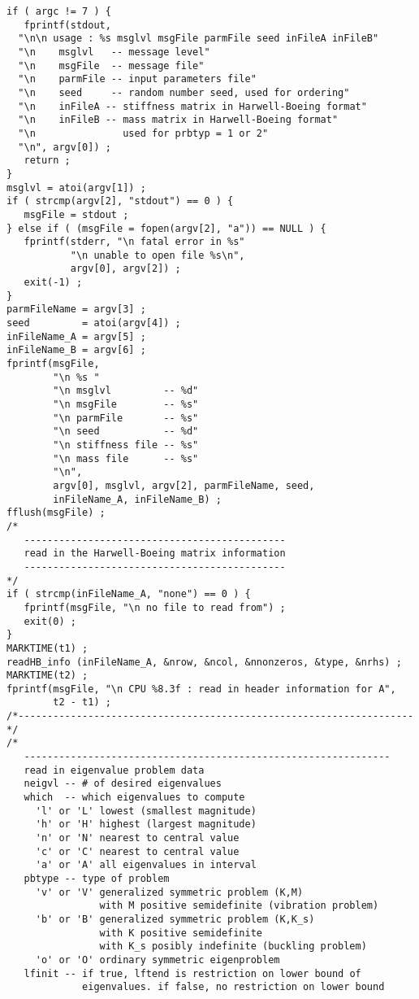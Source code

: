 \begin{verbatim}
if ( argc != 7 ) {
   fprintf(stdout, 
  "\n\n usage : %s msglvl msgFile parmFile seed inFileA inFileB"
  "\n    msglvl   -- message level"
  "\n    msgFile  -- message file"
  "\n    parmFile -- input parameters file"
  "\n    seed     -- random number seed, used for ordering"
  "\n    inFileA -- stiffness matrix in Harwell-Boeing format"
  "\n    inFileB -- mass matrix in Harwell-Boeing format"
  "\n               used for prbtyp = 1 or 2"
  "\n", argv[0]) ;
   return ;
}
msglvl = atoi(argv[1]) ;
if ( strcmp(argv[2], "stdout") == 0 ) {
   msgFile = stdout ;
} else if ( (msgFile = fopen(argv[2], "a")) == NULL ) {
   fprintf(stderr, "\n fatal error in %s"
           "\n unable to open file %s\n",
           argv[0], argv[2]) ;
   exit(-1) ;
}
parmFileName = argv[3] ;
seed         = atoi(argv[4]) ;
inFileName_A = argv[5] ;
inFileName_B = argv[6] ;
fprintf(msgFile, 
        "\n %s "
        "\n msglvl         -- %d" 
        "\n msgFile        -- %s" 
        "\n parmFile       -- %s" 
        "\n seed           -- %d" 
        "\n stiffness file -- %s" 
        "\n mass file      -- %s" 
        "\n",
        argv[0], msglvl, argv[2], parmFileName, seed, 
        inFileName_A, inFileName_B) ;
fflush(msgFile) ;
/*
   ---------------------------------------------
   read in the Harwell-Boeing matrix information
   ---------------------------------------------
*/
if ( strcmp(inFileName_A, "none") == 0 ) {
   fprintf(msgFile, "\n no file to read from") ;
   exit(0) ;
}
MARKTIME(t1) ;
readHB_info (inFileName_A, &nrow, &ncol, &nnonzeros, &type, &nrhs) ;
MARKTIME(t2) ;
fprintf(msgFile, "\n CPU %8.3f : read in header information for A",
        t2 - t1) ;
/*--------------------------------------------------------------------*/
/*
   ---------------------------------------------------------------
   read in eigenvalue problem data
   neigvl -- # of desired eigenvalues
   which  -- which eigenvalues to compute
     'l' or 'L' lowest (smallest magnitude)
     'h' or 'H' highest (largest magnitude)
     'n' or 'N' nearest to central value
     'c' or 'C' nearest to central value
     'a' or 'A' all eigenvalues in interval
   pbtype -- type of problem
     'v' or 'V' generalized symmetric problem (K,M)
                with M positive semidefinite (vibration problem)
     'b' or 'B' generalized symmetric problem (K,K_s)
                with K positive semidefinite
                with K_s posibly indefinite (buckling problem)
     'o' or 'O' ordinary symmetric eigenproblem
   lfinit -- if true, lftend is restriction on lower bound of 
             eigenvalues. if false, no restriction on lower bound

\end{verbatim}
